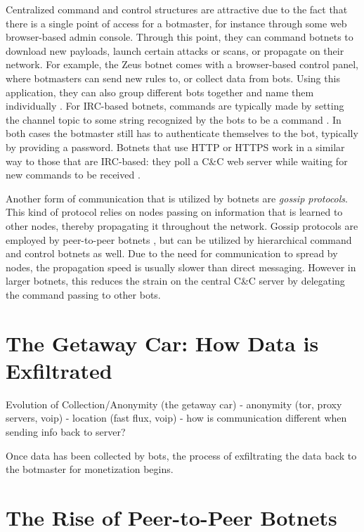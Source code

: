 \documentclass{acm_proc_article-sp}
\begin{document}
Centralized command and control structures are attractive due to the fact that there is a single point of access for a botmaster, for instance through some web browser-based admin console. Through this point, they can command botnets to download new payloads, launch certain attacks or scans, or propagate on their network. For example, the Zeus botnet comes with a browser-based control panel, where botmasters can send new rules to, or collect data from bots. Using this application, they can also group different bots together and name them individually \cite{blackhat:zeus}. For IRC-based botnets, commands are typically made by setting the channel topic to some string recognized by the bots to be a command \cite{honeynet:appendix}. In both cases the botmaster still has to authenticate themselves to the bot, typically by providing a password. Botnets that use HTTP or HTTPS work in a similar way to those that are IRC-based: they poll a C\&C web server while waiting for new commands to be received \cite{borgaonkar:analysis}.

Another form of communication that is utilized by botnets are \emph{gossip protocols}. This kind of protocol relies on nodes passing on information that is learned to other nodes, thereby propagating it throughout the network. Gossip protocols are employed by peer-to-peer botnets \cite{defcon:prowling}, but can be utilized by hierarchical command and control botnets as well. Due to the need for communication to spread by nodes, the propagation speed is usually slower than direct messaging. However in larger botnets, this reduces the strain on the central C\&C server by delegating the command passing to other bots.


\section{The Getaway Car: How Data is Exfiltrated}
Evolution of Collection/Anonymity (the getaway car)
    - anonymity (tor, proxy servers, voip)
    - location (fast flux, voip)
    - how is communication different when sending info back to server?

Once data has been collected by bots, the process of exfiltrating the data back to the botmaster for monetization begins.  


\section{The Rise of Peer-to-Peer Botnets}
\end{document}
